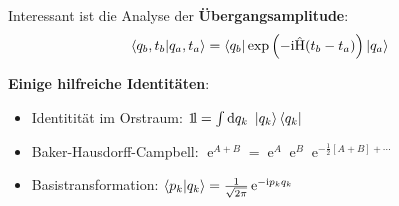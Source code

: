\documentclass{scrartcl}
\begin{document}
Interessant ist die Analyse der \textbf{Übergangsamplitude}:
\begin{align*}
\braket{q_b,t_b}{q_a,t_a} = \bra{q_b}\exp\left(-\mathrm{i} \hat{\text{H}}(t_b-t_a)\right)\ket{q_a}
\end{align*}

\textbf{Einige hilfreiche Identitäten}:

\begin{itemize}
\item Identitität im Orstraum: $\mathrm{1\!l} = \int\dd q_k \ \ket{q_k}\bra{q_k} $
\item Baker-Hausdorff-Campbell: $\operatorname{e}^{A+B} = \operatorname{e}^{A}\operatorname{e}^{B}\operatorname{e}^{-\frac{1}{2}[A+B] + \cdots} $
\item Basistransformation: $\braket{p_k}{q_k} = \frac{1}{\sqrt{2\pi}}\operatorname{e}^{-{\mathrm{i}p_kq_k}}$
\end{itemize}
\end{document}

